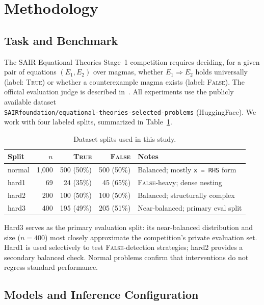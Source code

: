 \documentclass[11pt]{article}
\begin{document}
\section{Methodology}
\label{sec:method}

\subsection{Task and Benchmark}

The SAIR Equational Theories Stage~1 competition requires deciding,
for a given pair of equations $(E_1, E_2)$ over magmas, whether
$E_1 \Rightarrow E_2$ holds universally (label: \textsc{True}) or
whether a counterexample magma exists (label: \textsc{False}). The
official evaluation judge is described in~\citet{sair2026judge}. All
experiments use the publicly available dataset\\
\texttt{SAIRfoundation/equational-theories-selected-problems}
(HuggingFace). We work with four labeled splits, summarized in
Table~\ref{tab:splits}.

\begin{table}[h]
\centering
\caption{Dataset splits used in this study.}
\label{tab:splits}
\begin{tabular}{lrrrl}
\toprule
Split & $n$ & \textsc{True} & \textsc{False} & Notes \\
\midrule
normal & 1{,}000 & 500 (50\%) & 500 (50\%) & Balanced; mostly \texttt{x = RHS} form \\
hard1  & 69      & 24 (35\%)  & 45 (65\%)  & \textsc{False}-heavy; dense nesting \\
hard2  & 200     & 100 (50\%) & 100 (50\%) & Balanced; structurally complex \\
hard3  & 400     & 195 (49\%) & 205 (51\%) & Near-balanced; primary eval split \\
\bottomrule
\end{tabular}
\end{table}

Hard3 serves as the primary evaluation split: its near-balanced
distribution and size ($n=400$) most closely approximate the
competition's private evaluation set. Hard1 is used selectively to
test \textsc{False}-detection strategies; hard2 provides a secondary
balanced check. Normal problems confirm that interventions do not
regress standard performance.

\subsection{Models and Inference Configuration}
\end{document}
